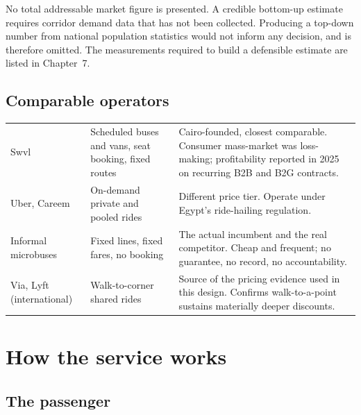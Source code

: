 \begin{notebox}
No total addressable market figure is presented. A credible bottom-up estimate requires corridor
demand data that has not been collected. Producing a top-down number from national population
statistics would not inform any decision, and is therefore omitted. The measurements required to
build a defensible estimate are listed in Chapter~7.
\end{notebox}

\section{Comparable operators}

\begin{center}
\begin{tabularx}{\textwidth}{@{}L{27mm}L{34mm}Y@{}}
\toprule
{} &  &  \\
\midrule
Swvl & Scheduled buses and vans, seat booking, fixed routes & Cairo-founded, closest comparable. Consumer mass-market was loss-making; profitability reported in 2025 on recurring B2B and B2G contracts. \\
Uber, Careem & On-demand private and pooled rides & Different price tier. Operate under Egypt's ride-hailing regulation. \\
Informal microbuses & Fixed lines, fixed fares, no booking & The actual incumbent and the real competitor. Cheap and frequent; no guarantee, no record, no accountability. \\
Via, Lyft (international) & Walk-to-corner shared rides & Source of the pricing evidence used in this design. Confirms walk-to-a-point sustains materially deeper discounts. \\
\bottomrule
\end{tabularx}
\end{center}

\chapter{How the service works}

\section{The passenger}

